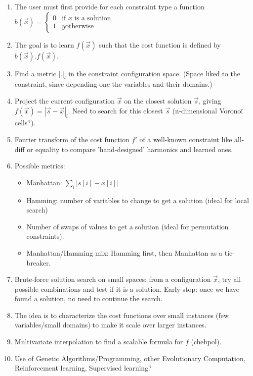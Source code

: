 \documentclass[a4paper, 12pt]{article}
\begin{document}
\begin{enumerate}
\item The user must first provide for each constraint type a function $b(\vec{x}) = \left\{
  \begin{array}{rl}
    0 & \text{if } x \text{ is a solution}\\
    1 & y\text{otherwise}
  \end{array} \right.$
\item The goal is to learn $f(\vec x)$ such that the cost function is defined by $b(\vec x) . f(\vec x)$.

\item Find a metric $|.|_l$ in the constraint configuration space. (\danger Space liked to the constraint, since depending one the variables and their domains.)
\item Project the current configuration $\vec{x}$ on the closest solution $\vec{s}$, giving $f(\vec x) = |\vec{s}-\vec{x}|_l$. Need to search for this closest $\vec{s}$ (n-dimensional Voronoï cells?).
\item Fourier transform of the cost function $f'$ of a well-known constraint like all-diff or equality to compare 'hand-designed' harmonics and learned ones.
\item Possible metrics:
  \begin{itemize}
  \item Manhattan: $\sum\limits_i |s[i] - x[i]|$
  \item Hamming: number of variables to change to get a solution (ideal for local search)
  \item Number of swaps of values to get a solution (ideal for permutation constraints).
  \item Manhattan/Hamming mix: Hamming first, then Manhattan as a tie-breaker.
  \end{itemize}
\item Brute-force solution search on small spaces: from a configuration $\vec{x}$, try all possible combinations and test if it is a solution. Early-stop: once we have found a solution, no need to continue the search.
\item The idea is to characterize the cost functions over small instances (few variables/small domains) to make it scale over larger instances.
\item Multivariate interpolation to find a scalable formula for $f$ (chebpol).
\item Use of Genetic Algorithms/Programming, other Evolutionary Computation, Reinforcement learning, Supervised learning?
\end{enumerate}
\end{document}
